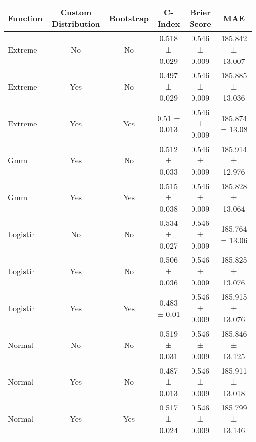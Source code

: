\begin{tabular}{lccccc}
\toprule
Function & Custom Distribution & Bootstrap & C-Index & Brier Score & MAE \\
\midrule
Extreme & No & No & 0.518 ± 0.029 & 0.546 ± 0.009 & 185.842 ± 13.007 \\
Extreme & Yes & No & 0.497 ± 0.029 & 0.546 ± 0.009 & 185.885 ± 13.036 \\
Extreme & Yes & Yes & 0.51 ± 0.013 & 0.546 ± 0.009 & 185.874 ± 13.08 \\
Gmm & Yes & No & 0.512 ± 0.033 & 0.546 ± 0.009 & 185.914 ± 12.976 \\
Gmm & Yes & Yes & 0.515 ± 0.038 & 0.546 ± 0.009 & 185.828 ± 13.064 \\
Logistic & No & No & 0.534 ± 0.027 & 0.546 ± 0.009 & 185.764 ± 13.06 \\
Logistic & Yes & No & 0.506 ± 0.036 & 0.546 ± 0.009 & 185.825 ± 13.076 \\
Logistic & Yes & Yes & 0.483 ± 0.01 & 0.546 ± 0.009 & 185.915 ± 13.076 \\
Normal & No & No & 0.519 ± 0.031 & 0.546 ± 0.009 & 185.846 ± 13.125 \\
Normal & Yes & No & 0.487 ± 0.013 & 0.546 ± 0.009 & 185.911 ± 13.018 \\
Normal & Yes & Yes & 0.517 ± 0.024 & 0.546 ± 0.009 & 185.799 ± 13.146 \\
\bottomrule
\end{tabular}
